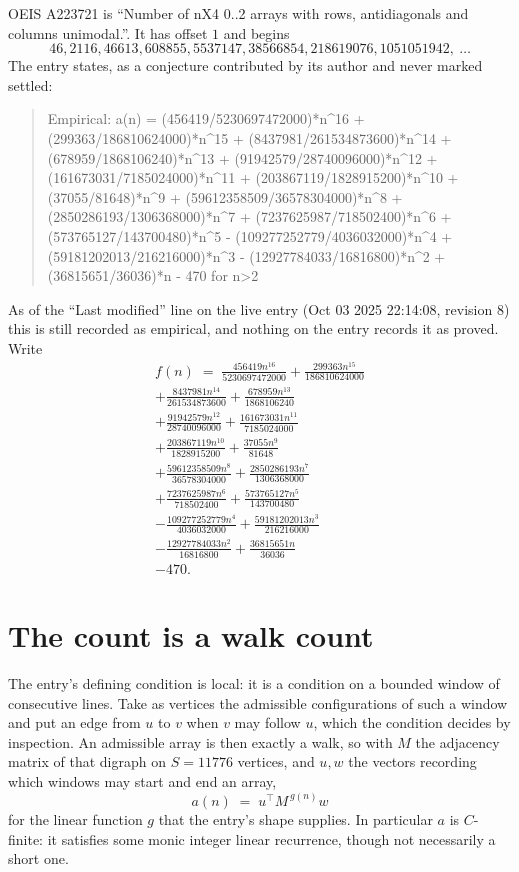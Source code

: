 \documentclass[11pt,a4paper]{article}
\theoremstyle{plain}
\theoremstyle{definition}
\begin{document}
OEIS A223721 is ``Number of nX4 0..2 arrays with rows, antidiagonals and columns unimodal.''. It has offset $1$ and begins
\[
46, 2116, 46613, 608855, 5537147, 38566854, 218619076, 1051051942,\ \dots
\]
The entry states, as a conjecture contributed by its author and never marked settled:
\begin{quote}\raggedright\small
Empirical: a(n) = (456419/5230697472000)*n\^{}16 + (299363/186810624000)*n\^{}15 + (8437981/261534873600)*n\^{}14 + (678959/1868106240)*n\^{}13 + (91942579/28740096000)*n\^{}12 + (161673031/7185024000)*n\^{}11 + (203867119/1828915200)*n\^{}10 + (37055/81648)*n\^{}9 + (59612358509/36578304000)*n\^{}8 + (2850286193/1306368000)*n\^{}7 + (7237625987/718502400)*n\^{}6 + (573765127/143700480)*n\^{}5 - (109277252779/4036032000)*n\^{}4 + (59181202013/216216000)*n\^{}3 - (12927784033/16816800)*n\^{}2 + (36815651/36036)*n - 470 for n>2
\end{quote}
As of the ``Last modified'' line on the live entry (Oct 03 2025 22:14:08, revision 8) this is still
recorded as empirical, and nothing on the entry records it as proved. Write
\begin{multline*}
f(n)\;=\;\frac{456419 n^{16}}{5230697472000} + \frac{299363 n^{15}}{186810624000} \\
+ \frac{8437981 n^{14}}{261534873600} + \frac{678959 n^{13}}{1868106240} \\
+ \frac{91942579 n^{12}}{28740096000} + \frac{161673031 n^{11}}{7185024000} \\
+ \frac{203867119 n^{10}}{1828915200} + \frac{37055 n^{9}}{81648} \\
+ \frac{59612358509 n^{8}}{36578304000} + \frac{2850286193 n^{7}}{1306368000} \\
+ \frac{7237625987 n^{6}}{718502400} + \frac{573765127 n^{5}}{143700480} \\
- \frac{109277252779 n^{4}}{4036032000} + \frac{59181202013 n^{3}}{216216000} \\
- \frac{12927784033 n^{2}}{16816800} + \frac{36815651 n}{36036} \\
- 470.
\end{multline*}

\section{The count is a walk count}

The entry's defining condition is local: it is a condition on a bounded window of consecutive lines. Take as vertices the
admissible configurations of such a window and put an edge from $u$ to $v$ when $v$ may
follow $u$, which the condition decides by inspection. An admissible array is then exactly a
walk, so with $M$ the adjacency matrix of that digraph on $S=11776$ vertices, and $u,w$ the
vectors recording which windows may start and end an array,
\[
a(n)\;=\;u^{\!\top}M^{\,g(n)}w
\]
for the linear function $g$ that the entry's shape supplies. In particular $a$ is
$C$-finite: it satisfies some monic integer linear recurrence, though not necessarily a short
one.
\end{document}
